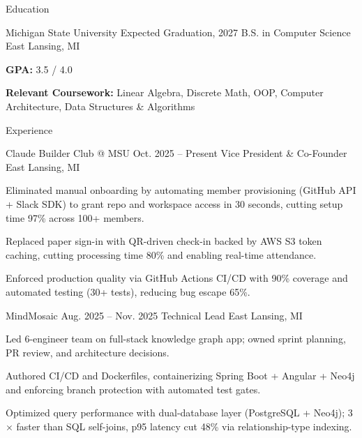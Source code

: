 \documentclass[
	11pt
]{../../../resume}
\begin{document}
	\begin{rSection}{E}{ducation}
		\begin{rSectionEntry}
			{Michigan State University}
			{Expected Graduation, 2027}
			{B.S. in Computer Science}
			{}
			{East Lansing, MI}

			\item \textbf{GPA:} 3.5 / 4.0
			\item \textbf{Relevant Coursework:} Linear Algebra, Discrete Math, OOP, Computer Architecture, Data Structures \& Algorithms
		\end{rSectionEntry}
	\end{rSection}

	\begin{rSection}{E}{xperience}
		\begin{rSectionEntry}
			{Claude Builder Club @ MSU}
			{Oct. 2025 -- Present}
			{Vice President \& Co-Founder}
			{}
			{East Lansing, MI}

			\item Eliminated manual onboarding by automating member provisioning (GitHub API + Slack SDK) to grant repo and workspace access in 30 seconds, cutting setup time 97\% across 100+ members.
			\item Replaced paper sign-in with QR-driven check-in backed by AWS S3 token caching, cutting processing time 80\% and enabling real-time attendance.
			\item Enforced production quality via GitHub Actions CI/CD with 90\% coverage and automated testing (30+ tests), reducing bug escape 65\%.
		\end{rSectionEntry}

		\begin{rSectionEntry}
			{MindMosaic}
			{Aug. 2025 -- Nov. 2025}
			{Technical Lead}
			{}
			{East Lansing, MI}

			\item Led 6-engineer team on full-stack knowledge graph app; owned sprint planning, PR review, and architecture decisions.
			\item Authored CI/CD and Dockerfiles, containerizing Spring Boot + Angular + Neo4j and enforcing branch protection with automated test gates.
			\item Optimized query performance with dual-database layer (PostgreSQL + Neo4j); 3$\times$ faster than SQL self-joins, p95 latency cut 48\% via relationship-type indexing.
		\end{rSectionEntry}
	\end{rSection}
\end{document}
